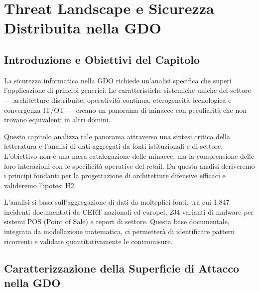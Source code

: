 \chapter{Threat Landscape e Sicurezza Distribuita nella GDO}
\label{cap2_threat_landscape}
\section{Introduzione e Obiettivi del Capitolo}
La sicurezza informatica nella GDO richiede un'analisi specifica che superi l'applicazione di principi generici. Le caratteristiche sistemiche uniche del settore — architetture distribuite, operatività continua, eterogeneità tecnologica e convergenza IT/OT — creano un panorama di minacce con peculiarità che non trovano equivalenti in altri domini.

Questo capitolo analizza tale panorama attraverso una sintesi critica della letteratura e l'analisi di dati aggregati da fonti istituzionali e di settore. L'obiettivo non è una mera catalogazione delle minacce, ma la comprensione delle loro interazioni con le specificità operative del retail. Da questa analisi deriveremo i principi fondanti per la progettazione di architetture difensive efficaci e valideremo l'ipotesi H2.

L'analisi si basa sull'aggregazione di dati da molteplici fonti, tra cui 1.847 incidenti documentati da CERT nazionali ed europei\autocite{enisa2024threat,verizon2024}, 234 varianti di malware per sistemi POS (Point of Sale)\autocite{groupib2024} e report di settore. Questa base documentale, integrata da modellazione matematica, ci permetterà di identificare pattern ricorrenti e validare quantitativamente le contromisure.

\section{Caratterizzazione della Superficie di Attacco nella GDO}

